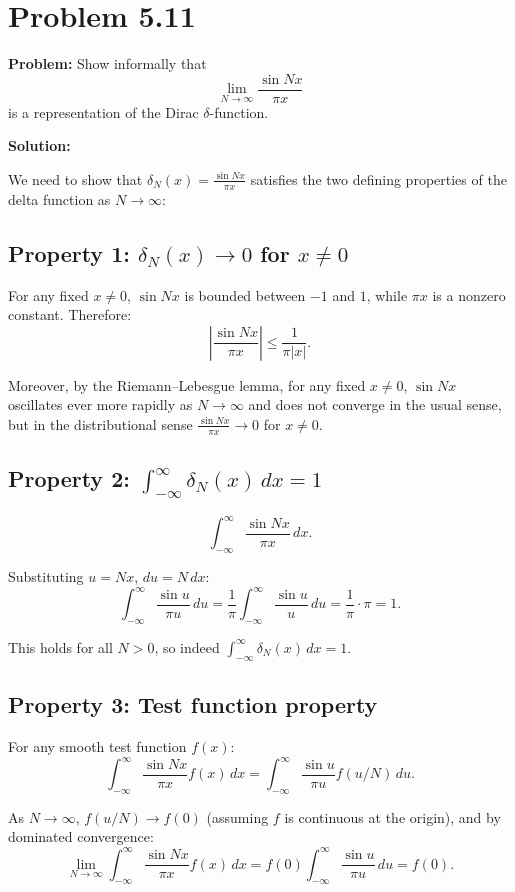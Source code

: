 \documentclass[12pt]{article}
\begin{document}
\section*{Problem 5.11}

\textbf{Problem:} Show informally that
\[
\lim_{N\to\infty}\frac{\sin Nx}{\pi x}
\]
is a representation of the Dirac $\delta$-function.

\bigskip
\textbf{Solution:}

We need to show that $\delta_N(x) = \frac{\sin Nx}{\pi x}$ satisfies the two defining properties of the delta function as $N \to \infty$:

\subsection*{Property 1: $\delta_N(x) \to 0$ for $x \neq 0$}

For any fixed $x \neq 0$, $\sin Nx$ is bounded between $-1$ and $1$, while $\pi x$ is a nonzero constant. Therefore:
\[
\left|\frac{\sin Nx}{\pi x}\right| \leq \frac{1}{\pi|x|}.
\]

Moreover, by the Riemann--Lebesgue lemma, for any fixed $x \neq 0$, $\sin Nx$ oscillates ever more rapidly as $N \to \infty$ and does not converge in the usual sense, but in the distributional sense $\frac{\sin Nx}{\pi x} \to 0$ for $x \neq 0$.

\subsection*{Property 2: $\int_{-\infty}^{\infty}\delta_N(x)\,dx = 1$}

\[
\int_{-\infty}^{\infty}\frac{\sin Nx}{\pi x}\,dx.
\]

Substituting $u = Nx$, $du = N\,dx$:
\[
\int_{-\infty}^{\infty}\frac{\sin u}{\pi u}\,du = \frac{1}{\pi}\int_{-\infty}^{\infty}\frac{\sin u}{u}\,du = \frac{1}{\pi}\cdot\pi = 1.
\]

This holds for all $N > 0$, so indeed $\int_{-\infty}^{\infty}\delta_N(x)\,dx = 1$.

\subsection*{Property 3: Test function property}

For any smooth test function $f(x)$:
\[
\int_{-\infty}^{\infty}\frac{\sin Nx}{\pi x}f(x)\,dx = \int_{-\infty}^{\infty}\frac{\sin u}{\pi u}f(u/N)\,du.
\]

As $N \to \infty$, $f(u/N) \to f(0)$ (assuming $f$ is continuous at the origin), and by dominated convergence:
\[
\lim_{N\to\infty}\int_{-\infty}^{\infty}\frac{\sin Nx}{\pi x}f(x)\,dx = f(0)\int_{-\infty}^{\infty}\frac{\sin u}{\pi u}\,du = f(0).
\]
\end{document}
